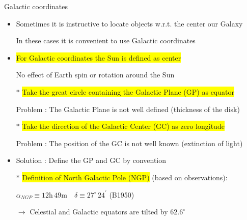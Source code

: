 \Tr
\begin{center}
{\red Galactic coordinates}
\end{center}
%
\begin{itemize}
\item Sometimes it is instructive to locate objects w.r.t. the center our Galaxy
\item[] In these cases it is convenient to use Galactic coordinates
\item \colorbox{yellow}{For Galactic coordinates the Sun is defined as center}
\item[] No effect of Earth spin or rotation around the Sun
\item[$\ast$] \colorbox{yellow}{Take the great circle containing the Galactic Plane (GP) as equator}
\item[] Problem : The Galactic Plane is not well defined (thickness of the disk)
\item[$\ast$] \colorbox{yellow}{Take the direction of the Galactic Center (GC) as zero longitude}
\item[] Problem : The position of the GC is not well known (extinction of light)
\item Solution : {\blue Define the GP and GC by convention}
\item[$\ast$] \colorbox{yellow}{Definition of North Galactic Pole (NGP)} (based on observations):
\item[] $\alpha_{NGP} \equiv 12\text{h}\,49\text{m} \quad \delta \equiv 27^{\circ}\,24^{\prime}$ (B1950)
\item[] $\rightarrow$ Celestial and Galactic equators are tilted by $62.6^{\circ}$
\end{itemize}

